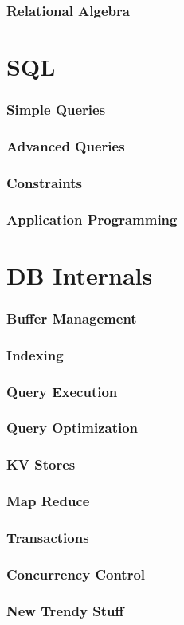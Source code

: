 \documentclass[12pt]{article}
\theoremstyle{definition}
\begin{document}
\section{Relational Algebra}

\part{SQL}
\section{Simple Queries}
\section{Advanced Queries}
\section{Constraints}
\section{Application Programming}

\part{DB Internals}
\section{Buffer Management}
\section{Indexing}
\section{Query Execution}
\section{Query Optimization}
\section{KV Stores}
\section{Map Reduce}
\section{Transactions}
\section{Concurrency Control}
\section{New Trendy Stuff}
\end{document}
